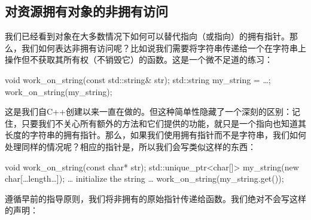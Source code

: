 \subsection{对资源拥有对象的非拥有访问}

我们已经看到对象在大多数情况下如何可以替代指向（或指向）的拥有指针。那么，我们如何表达非拥有访问呢？比如说我们需要将字符串传递给一个在字符串上操作但不获取其所有权（不销毁它）的函数。这是一个微不足道的练习：

\begin{code}
void work_on_string(const std::string& str);
std::string my_string = …;
work_on_string(my_string);
\end{code}

这是我们自C++创建以来一直在做的。但这种简单性隐藏了一个深刻的区别：记住，只要我们不关心所有额外的方法和它们提供的功能，就只是一个指向也知道其长度的字符串的拥有指针。那么，如果我们使用拥有指针而不是字符串，我们如何处理同样的情况呢？相应的指针是，所以我们会写类似这样的东西：

\begin{code}
void work_on_string(const char* str);
std::unique_ptr<char[]> my_string(new char[…length…]);
… initialize the string …
work_on_string(my_string.get());
\end{code}

遵循早前的指导原则，我们将非拥有的原始指针传递给函数。我们绝对不会写这样的声明：

